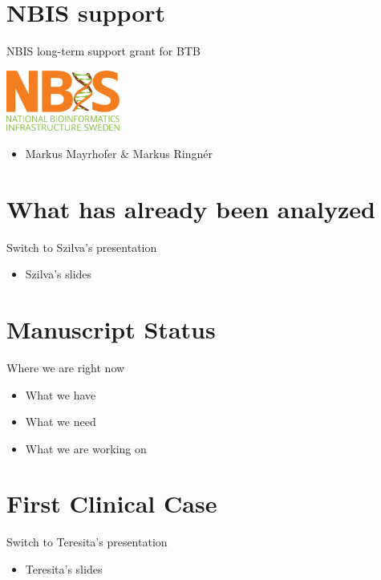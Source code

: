 \documentclass{beamer}
\begin{document}
\section{NBIS support}

\begin{frame}{NBIS long-term support grant for BTB}
	\begin{center}
		\includegraphics[height=2cm]{pictures/NBIS}
	\end{center}
	\begin{itemize}
		\item Markus Mayrhofer \& Markus Ringnér
	\end{itemize}
\end{frame}

\section{What has already been analyzed}

\begin{frame}{Switch to Szilva's presentation}
	\begin{itemize}
		\item Szilva's slides
	\end{itemize}
\end{frame}

\section{Manuscript Status}

\begin{frame}{Where we are right now}
	\begin{itemize}
		\item What we have
		\item What we need
		\item What we are working on
	\end{itemize}
\end{frame}

\section{First Clinical Case}

\begin{frame}{Switch to Teresita's presentation}
	\begin{itemize}
		\item Teresita's slides
	\end{itemize}
\end{frame}
\end{document}
